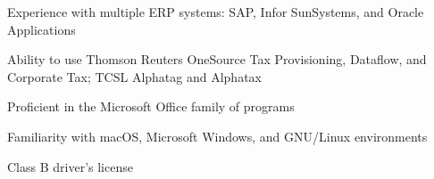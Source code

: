 


\begin{cvsimplelist}


    \item{Experience with multiple ERP systems: SAP, Infor SunSystems, and Oracle Applications}
    \item{Ability to use Thomson Reuters OneSource Tax Provisioning, Dataflow, and Corporate Tax; TCSL Alphatag and Alphatax}
    \item{Proficient in the Microsoft Office family of programs}
    \item{Familiarity with macOS, Microsoft Windows, and GNU/Linux environments}
    \item{Class B driver's license}


\end{cvsimplelist}
